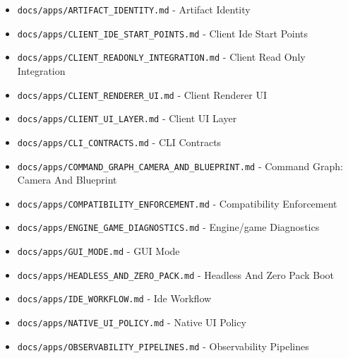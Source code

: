 \documentclass[10.5pt,a4paper,openany]{book}
\begin{document}
\begin{itemize}
\item \texttt{docs/\allowbreak{}apps/\allowbreak{}ARTIFACT\_\allowbreak{}IDENTITY.\allowbreak{}md} -\allowbreak{} Artifact Identity
\item \texttt{docs/\allowbreak{}apps/\allowbreak{}CLIENT\_\allowbreak{}IDE\_\allowbreak{}START\_\allowbreak{}POINTS.\allowbreak{}md} -\allowbreak{} Client Ide Start Points
\item \texttt{docs/\allowbreak{}apps/\allowbreak{}CLIENT\_\allowbreak{}READONLY\_\allowbreak{}INTEGRATION.\allowbreak{}md} -\allowbreak{} Client Read Only Integration
\item \texttt{docs/\allowbreak{}apps/\allowbreak{}CLIENT\_\allowbreak{}RENDERER\_\allowbreak{}UI.\allowbreak{}md} -\allowbreak{} Client Renderer UI
\item \texttt{docs/\allowbreak{}apps/\allowbreak{}CLIENT\_\allowbreak{}UI\_\allowbreak{}LAYER.\allowbreak{}md} -\allowbreak{} Client UI Layer
\item \texttt{docs/\allowbreak{}apps/\allowbreak{}CLI\_\allowbreak{}CONTRACTS.\allowbreak{}md} -\allowbreak{} CLI Contracts
\item \texttt{docs/\allowbreak{}apps/\allowbreak{}COMMAND\_\allowbreak{}GRAPH\_\allowbreak{}CAMERA\_\allowbreak{}AND\_\allowbreak{}BLUEPRINT.\allowbreak{}md} -\allowbreak{} Command Graph: Camera And Blueprint
\item \texttt{docs/\allowbreak{}apps/\allowbreak{}COMPATIBILITY\_\allowbreak{}ENFORCEMENT.\allowbreak{}md} -\allowbreak{} Compatibility Enforcement
\item \texttt{docs/\allowbreak{}apps/\allowbreak{}ENGINE\_\allowbreak{}GAME\_\allowbreak{}DIAGNOSTICS.\allowbreak{}md} -\allowbreak{} Engine/\allowbreak{}game Diagnostics
\item \texttt{docs/\allowbreak{}apps/\allowbreak{}GUI\_\allowbreak{}MODE.\allowbreak{}md} -\allowbreak{} GUI Mode
\item \texttt{docs/\allowbreak{}apps/\allowbreak{}HEADLESS\_\allowbreak{}AND\_\allowbreak{}ZERO\_\allowbreak{}PACK.\allowbreak{}md} -\allowbreak{} Headless And Zero Pack Boot
\item \texttt{docs/\allowbreak{}apps/\allowbreak{}IDE\_\allowbreak{}WORKFLOW.\allowbreak{}md} -\allowbreak{} Ide Workflow
\item \texttt{docs/\allowbreak{}apps/\allowbreak{}NATIVE\_\allowbreak{}UI\_\allowbreak{}POLICY.\allowbreak{}md} -\allowbreak{} Native UI Policy
\item \texttt{docs/\allowbreak{}apps/\allowbreak{}OBSERVABILITY\_\allowbreak{}PIPELINES.\allowbreak{}md} -\allowbreak{} Observability Pipelines

\end{itemize}
\end{document}
